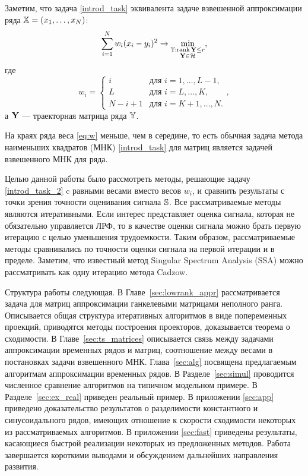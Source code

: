 \documentclass[12pt, specialist, subf,href,colorlinks=true,substylefile = spbu.rtx]{disser}
\def\rank{\mathop{\mathrm{rank}}}
\theoremstyle{remark}
\theoremstyle{definition}
\begin{document}
Заметим, что задача \eqref{introd_task} эквивалента задаче взвешенной аппроксимации ряда $\mathbb{X} = (x_1, \ldots, x_N)$:
\begin{equation}\label{introd_task_2}
\sum_{i = 1}^N w_i(x_i - y_i)^2 \to \min_{\substack{\tsY: \rank \bfY \le r \\ \bfY \in \calH}},
\end{equation}
где
\begin{equation}
\label{eq:w}
w_i = \begin{cases}
i & \text{для $i = 1, \ldots, L-1,$}\\
L & \text{для $i = L, \ldots, K,$}\\
N - i + 1 & \text{для $i = K + 1, \ldots, N.$}
\end{cases},
\end{equation}
а $\mathbf{Y}$ --- траекторная матрица ряда $\mathbb{Y}$.

На краях ряда веса \eqref{eq:w} меньше, чем в середине, то есть обычная задача метода наименьших квадратов (МНК) \eqref{introd_task} для матриц является задачей взвешенного МНК для ряда.

Целью данной работы было рассмотреть методы, решающие задачу \eqref{introd_task_2} c равными весами вместо весов $w_i$, и сравнить результаты с точки зрения точности оценивания сигнала $\mathbb{S}$. Все рассматриваемые методы являются итеративными. Если интерес представляет оценка сигнала, которая не обязательно управляется ЛРФ, то в качестве оценки сигнала можно брать первую итерацию с целью уменьшения трудоемкости. Таким образом, рассматриваемые методы сравнивались по точности оценки сигнала на первой итерации и в пределе. Заметим, что известный метод Singular Spectrum Analysis (SSA) \cite{Broomhead.King1986, Vautard.etal1992, Elsner.Tsonis1996, Golyandina.etal2001, Ghil.etal2002, Golyandina.Zhigljavsky2012} можно
рассматривать как одну итерацию метода Cadzow.

Структура работы следующая.  В Главе~\ref{sec:lowrank_appr} рассматривается задача для матриц аппроксимации ганкелевыми матрицами неполного ранга.
Описывается общая структура итеративных алгоритмов в виде попеременных проекций, приводятся методы построения проекторов, доказывается теорема о сходимости.
В Главе~\ref{sec:ts_matrices} описывается связь между задачами аппроксимации временных рядов и матриц, соотношение между весами в постановках задачи
взвешенного МНК. Глава~\ref{sec:alg} посвящена предлагаемым алгоритмам аппроксимации временных рядов. В Разделе~\ref{sec:simul} проводится численное сравнение алгоритмов на типичном модельном примере. В Разделе~\ref{sec:ex_real} приведен реальный пример.
В приложении \ref{sec:app} приведено доказательство результатов
о разделимости константного и синусоидального рядов, имеющих отношение к скорости сходимости некоторых из рассматриваемых алгоритмов. В приложении \ref{sec:fast} приведены результаты, касающиеся быстрой реализации некоторых из предложенных методов. Работа завершается короткими выводами и обсуждением дальнейших направления развития.
\end{document}
